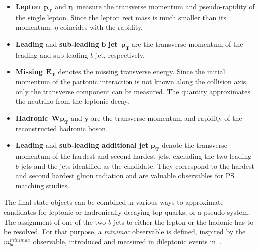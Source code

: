 \begin{itemize}
\item \textbf{ Lepton}~\( \bm{p_T}\) and \(\bm{\eta~}\) measure the transverse momentum and pseudo-rapidity of the single lepton. Since the lepton rest mass is much smaller than its momentum, $\eta$ coincides with the rapidity.
\item \textbf{ Leading} and \textbf{sub-leading} $\bm{b}$ \textbf{jet}~\(\bm{p_T}\) are the transverse momentum of the leading and sub-leading $b$ jet, respectively.
\item \textbf{ Missing}~\(\bm{E_T}\) denotes the missing transverse energy. Since the initial momentum of the partonic interaction is not known along the collision axis, only the transverse component can be measured. The quantity approximates the neutrino from the leptonic \Wboson decay.
\item \textbf{ Hadronic}~\(\bm{W p_T}\) and $\bm{y}$ are the transverse momentum and rapidity of the reconstructed hadronic \Wboson boson.
\item \textbf{ Leading} and \textbf{sub-leading additional jet } \(\bm{p_T}\) denote the transverse momentum of the hardest and second-hardest jets, excluding the two leading $b$ jets and the jets identified as the \Wboson candidate. They correspond to the hardest and second hardest gluon radiation and are valuable observables for PS matching studies.
\end{itemize}

\noindent
The final state objects can be combined in various ways to approximate candidates for
leptonic or hadronically decaying top quarks, or a pseudo-\ttbar system.
The assignment of one of the two $b$ jets to either the lepton or the hadonic \Wboson 
has to be resolved.
For that purpose, a \textit{minimax} observable is defined, inspired
by the $m^{minimax}_{bl}$ observable, introduced and measured in dileptonic \ttbar events in~\cite{TOPQ-2017-05}.

